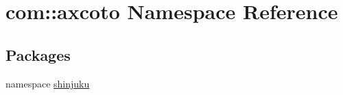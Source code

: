 \hypertarget{namespacecom_1_1axcoto}{\section{com\-:\-:axcoto \-Namespace \-Reference}
\label{namespacecom_1_1axcoto}
}
\subsection*{\-Packages}
\begin{DoxyCompactItemize}
\item 
namespace \hyperlink{namespacecom_1_1axcoto_1_1shinjuku}{shinjuku}
\end{DoxyCompactItemize}
